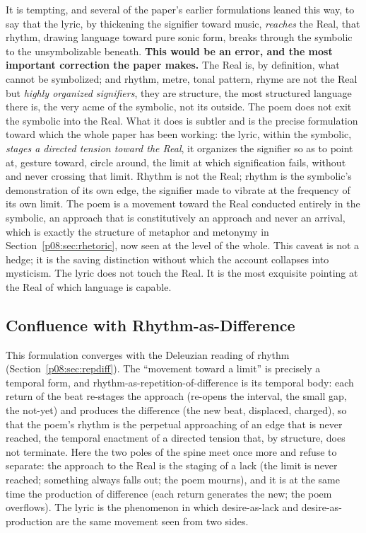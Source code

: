 It is tempting, and several of the paper's earlier formulations leaned this way, to say that the lyric, by thickening the signifier toward music, \emph{reaches} the Real, that rhythm, drawing language toward pure sonic form, breaks through the symbolic to the unsymbolizable beneath. \textbf{This would be an error, and the most important correction the paper makes.} The Real is, by definition, what cannot be symbolized; and rhythm, metre, tonal pattern, rhyme are not the Real but \emph{highly organized signifiers}, they are structure, the most structured language there is, the very acme of the symbolic, not its outside. The poem does not exit the symbolic into the Real. What it does is subtler and is the precise formulation toward which the whole paper has been working: the lyric, within the symbolic, \emph{stages a directed tension toward the Real}, it organizes the signifier so as to point at, gesture toward, circle around, the limit at which signification fails, without and never crossing that limit. Rhythm is not the Real; rhythm is the symbolic's demonstration of its own edge, the signifier made to vibrate at the frequency of its own limit. The poem is a movement toward the Real conducted entirely in the symbolic, an approach that is constitutively an approach and never an arrival, which is exactly the structure of metaphor and metonymy in Section~\ref{p08:sec:rhetoric}, now seen at the level of the whole. This caveat is not a hedge; it is the saving distinction without which the account collapses into mysticism. The lyric does not touch the Real. It is the most exquisite pointing at the Real of which language is capable.

\subsection{Confluence with Rhythm-as-Difference}

This formulation converges with the Deleuzian reading of rhythm (Section~\ref{p08:sec:repdiff}). The ``movement toward a limit'' is precisely a temporal form, and rhythm-as-repetition-of-difference is its temporal body: each return of the beat re-stages the approach (re-opens the interval, the small gap, the not-yet) and produces the difference (the new beat, displaced, charged), so that the poem's rhythm is the perpetual approaching of an edge that is never reached, the temporal enactment of a directed tension that, by structure, does not terminate. Here the two poles of the spine meet once more and refuse to separate: the approach to the Real is the staging of a lack (the limit is never reached; something always falls out; the poem mourns), and it is at the same time the production of difference (each return generates the new; the poem overflows). The lyric is the phenomenon in which desire-as-lack and desire-as-production are the same movement seen from two sides.

